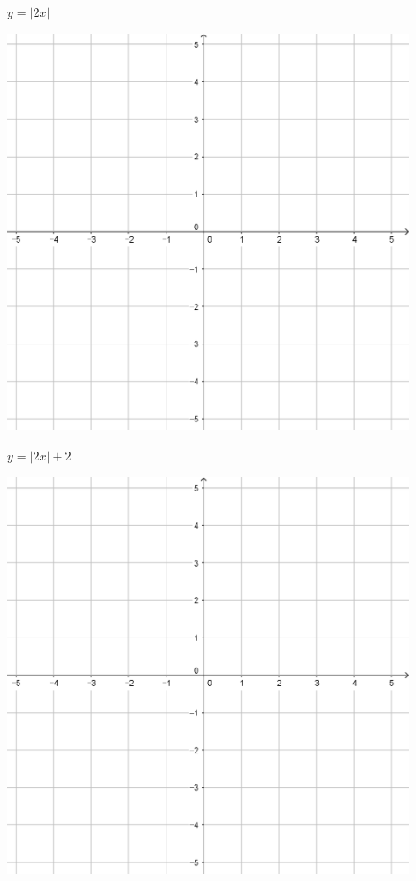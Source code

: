 \documentclass[a4paper]{oblivoir}
\begin{document}
\begin{minipage}{0.45\textwidth}\centering
\(y=|2x|\)
\par\bigskip\includegraphics[width=0.9\textwidth]{55}
\end{minipage}
\begin{minipage}{0.45\textwidth}\centering
\(y=|2x|+2\)
\par\bigskip\includegraphics[width=0.9\textwidth]{55}
\end{minipage}\bigskip\bigskip\par
\end{document}
